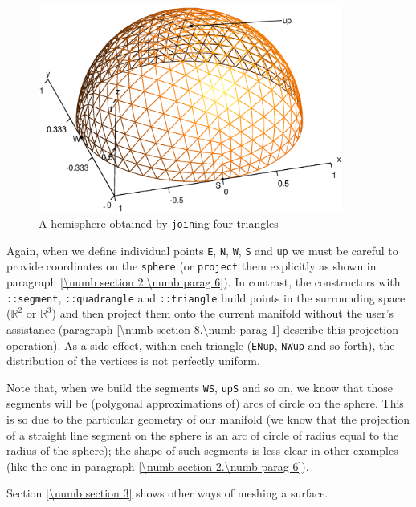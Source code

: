 \begin{figure} \centering
  \includegraphics[width=100mm]{hemisphere}
  \caption{A hemisphere obtained by {\small\tt join}ing four triangles}
\end{figure}

Again, when we define individual points {\small\tt E}, {\small\tt N}, {\small\tt W},
{\small\tt S} and {\small\tt up} we must be careful to provide coordinates on the
{\small\tt sphere} (or {\small\tt project} them explicitly as shown in paragraph
\ref{\numb section 2.\numb parag 6}).
In contrast, the {\small\tt {}} constructors with {\small\tt {}::segment},
{\small\tt {}::quadrangle} and {\small\tt {}::triangle} build points in the
surrounding space ($ \mathbb{R}^2 $ or $ \mathbb{R}^3 $) and
then project them onto the current manifold without the user's assistance (paragraph
\ref{\numb section 8.\numb parag 1} describe this projection operation).
As a side effect, within each triangle ({\small\tt ENup}, {\small\tt NWup} and so forth),
the distribution of the vertices is not perfectly uniform.

Note that, when we build the segments {\small\tt WS}, {\small\tt upS} and so on,
we know that those segments will be (polygonal approximations of) arcs of circle on the sphere.
This is so due to the particular geometry of our manifold (we know that the projection of
a straight line segment on the sphere is an arc of circle of radius equal to the radius of
the sphere); the shape of such segments is less clear in other examples
(like the one in paragraph \ref{\numb section 2.\numb parag 6}).

Section \ref{\numb section 3} shows other ways of meshing a surface.


